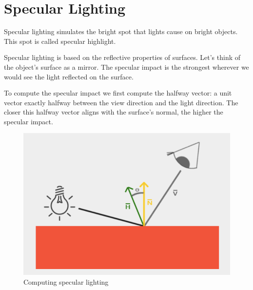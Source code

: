 \section{Specular Lighting}

Specular lighting simulates the bright spot that lights cause on bright objects.
This spot is called specular highlight.

Specular lighting is based on the reflective properties of surfaces.
Let's think of the object's surface as a mirror.
The specular impact is the strongest wherever we would see the light
reflected on the surface.

To compute the specular impact we first compute the halfway vector:
a unit vector exactly halfway between the view direction and the light direction.
The closer this halfway vector aligns with the surface's normal, the higher
the specular impact.

\begin{figure}[ht]
    \centering
    \includegraphics[scale=0.40]{images/ChBlinnPhong/SpecularLighting.png}
    \caption{Computing specular lighting}
    \label{fig::SpecularLighting}
\end{figure}

\begin{minipage}{\linewidth}{\noindent}
    
\end{minipage}

